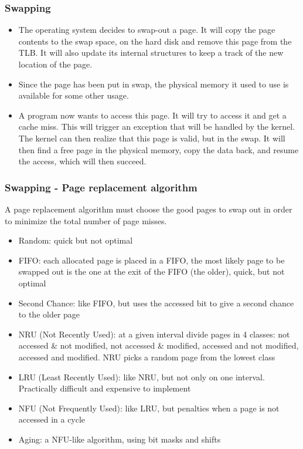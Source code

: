 \begin{frame}
  \frametitle{Swapping}

  \begin{itemize}
  \item The operating system decides to swap-out a page. It will copy the page contents to the swap space, on the hard disk and remove this page from the TLB. It will also update its internal structures to keep a track of the new location of the page.
  \item Since the page has been put in swap, the physical memory it used to use is available for some other usage.
  \item A program now wants to access this page. It will try to access it and get a cache miss. This will trigger an exception that will be handled by the kernel. The kernel can then realize that this page is valid, but in the swap. It will then find a free page in the physical memory, copy the data back, and resume the access, which will then succeed.
  \end{itemize}

\end{frame}

\begin{frame}
  \frametitle{Swapping - Page replacement algorithm}

  A page replacement algorithm must choose the good pages to swap out
  in order to minimize the total number of page misses.

  \-

  \begin{itemize}
  \item
    Random: quick but not optimal
  \item
    FIFO: each allocated page is placed in a FIFO, the most likely
    page to be swapped out is the one at the exit of the FIFO (the
    older), quick, but not optimal
  \item
    Second Chance: like FIFO, but uses the accessed bit to give a
    second chance to the older page
  \item
    NRU (Not Recently Used): at a given interval divide pages in 4
    classes: not accessed \& not modified, not accessed \& modified,
    accessed and not modified, accessed and modified. NRU picks a
    random page from the lowest class
  \item
    LRU (Least Recently Used): like NRU, but not only on one
    interval. Practically difficult and expensive to implement
  \item
    NFU (Not Frequently Used): like LRU, but penalties when a page is
    not accessed in a cycle
  \item
    Aging: a NFU-like algorithm, using bit masks and shifts
  \end{itemize}

\end{frame}

